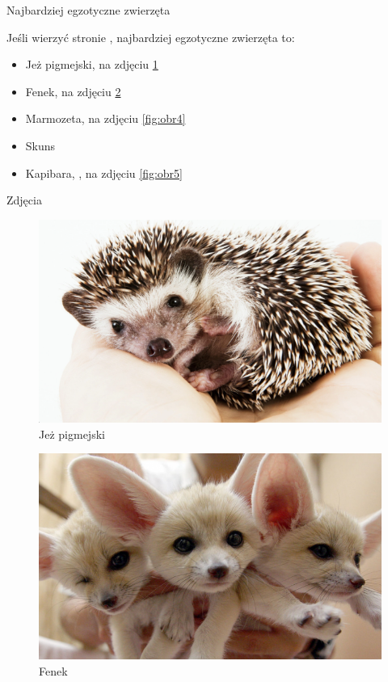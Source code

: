 \documentclass[hyperref={colorlinks = true,linkcolor = black}]{beamer}
\begin{document}
\begin{frame}{Najbardziej egzotyczne zwierzęta}

Jeśli wierzyć stronie \cite{b3}, najbardziej egzotyczne zwierzęta to:
\begin{itemize}
  \item Jeż pigmejski, na zdjęciu \ref{fig:obr2}
  \item Fenek, na zdjęciu \ref{fig:obr3}
  \item Marmozeta, na zdjęciu \ref{fig:obr4}
  \item Skuns
  \item Kapibara, , na zdjęciu \ref{fig:obr5}
\end{itemize}

\end{frame}

\begin{frame}{Zdjęcia}

\begin{figure}[h]
\includegraphics[scale=0.12]{jez.png}
\caption{Jeż pigmejski}
\label{fig:obr2}
\end{figure}

\begin{figure}[h]
\includegraphics[scale=0.12]{fenek.png}
\caption{Fenek}
\label{fig:obr3}
\end{figure}


\end{frame}
\end{document}
